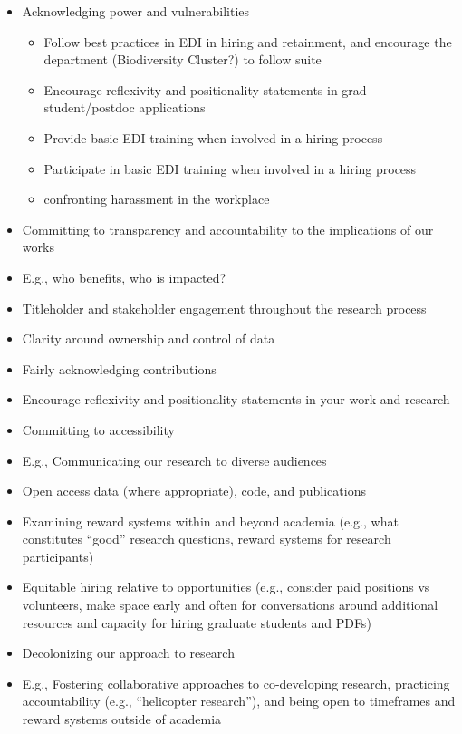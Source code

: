 \documentclass[
]{book}
\providecommand{\tightlist}{%
  \setlength{\itemsep}{0pt}\setlength{\parskip}{0pt}}
\begin{document}
\begin{itemize}
\item
  Acknowledging power and vulnerabilities

  \begin{itemize}
  \tightlist
  \item
    Follow best practices in EDI in hiring and retainment, and encourage the department (Biodiversity Cluster?) to follow suite
  \item
    Encourage reflexivity and positionality statements in grad student/postdoc applications
  \item
    Provide basic EDI training when involved in a hiring process
  \item
    Participate in basic EDI training when involved in a hiring process
  \item
    confronting harassment in the workplace
  \end{itemize}
\item
  Committing to transparency and accountability to the implications of our works
\item
  E.g., who benefits, who is impacted?
\item
  Titleholder and stakeholder engagement throughout the research process
\item
  Clarity around ownership and control of data
\item
  Fairly acknowledging contributions
\item
  Encourage reflexivity and positionality statements in your work and research
\item
  Committing to accessibility
\item
  E.g., Communicating our research to diverse audiences
\item
  Open access data (where appropriate), code, and publications
\item
  Examining reward systems within and beyond academia (e.g., what constitutes ``good'' research questions, reward systems for research participants)
\item
  Equitable hiring relative to opportunities (e.g., consider paid positions vs volunteers, make space early and often for conversations around additional resources and capacity for hiring graduate students and PDFs)
\item
  Decolonizing our approach to research
\item
  E.g., Fostering collaborative approaches to co-developing research, practicing accountability (e.g., ``helicopter research''), and being open to timeframes and reward systems outside of academia

\end{itemize}
\end{document}
